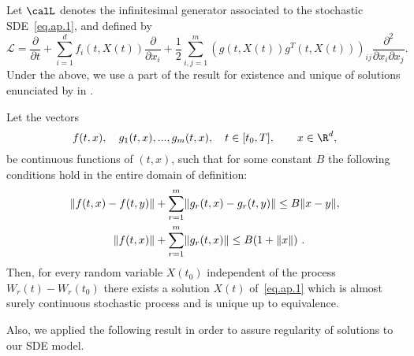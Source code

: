 	Let $\calL$ denotes the infinitesimal generator associated to the stochastic 
	SDE~\eqref{eq.ap.1}, and defined by
\begin{equation}\label{eq.ap.2}
	\mathcal{L} =
		\frac{\partial }{\partial t} 
		+
		\sum_{i=1}^d
			f_{i}(t,X(t))
			\frac{\partial}{\partial x_{i}}
			+
			\frac{1}{2}
		\sum_{i,j=1}^m
			\left(
				g(t, X(t)) g^{T}(t, X(t))
			\right)_{ij}
			\frac{\partial^{2}}{\partial x_{i}\partial x_{j}}.
\end{equation}
Under the above, we use a part of the result for existence and unique of 
solutions enunciated by \citeauthor*{Khasminskii2012} in \cite{Khasminskii2012}.
\begin{theorem}\label{thm:existence}
	Let the vectors 
	$$
		f(t,x), \quad g_1(t,x), ..., g_m(t,x), \quad
		t\in [t_{0},T],
		\qquad x\in \R^{d},
	$$
	be continuous functions of $(t,x)$, such that for some constant $B$ the 
	following conditions hold in the entire domain of definition:
	\begin{equation}
		\begin{aligned}\label{eq.ap.3}
			\lVert
				f(t,x)- f(t,y)
			\rVert 
			&+ 
			\sum
				\limits_{r=1}^{m}
				\lVert
					g_{r}(t,x)- g_r(t,y)
				\rVert
			\leq B 
			\lVert x-y\rVert,\\
			\lVert
				f(t,x)\rVert 
				&+ 
				\sum
				\limits_{r=1}^{m}
				\lVert
					g_r(t,x)\rVert 
				\leq B (1 + \lVert x\rVert) ~.
		\end{aligned}
	\end{equation}
	Then, for every random variable $X(t_{0})$ independent of the process 
	$W_{r}(t)-W_{r}(t_{0})$ there exists a solution $X(t)$ of~\eqref{eq.ap.1} 
	which is almost surely continuous stochastic process and is unique up to 
	equivalence.
\end{theorem}
Also, we applied the following result in order to assure regularity of 
solutions to our SDE model.
